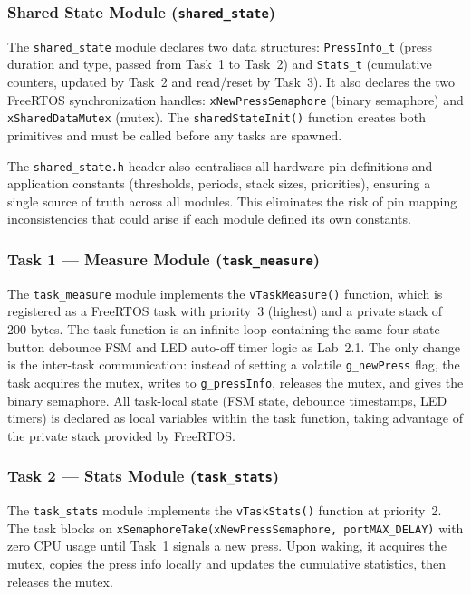 \subsubsection{Shared State Module (\texttt{shared\_state})}

The \texttt{shared\_state} module declares two data structures: \texttt{PressInfo\_t} (press duration and type, passed from Task~1 to Task~2) and \texttt{Stats\_t} (cumulative counters, updated by Task~2 and read/reset by Task~3). It also declares the two FreeRTOS synchronization handles: \texttt{xNewPressSemaphore} (binary semaphore) and \texttt{xSharedDataMutex} (mutex). The \texttt{sharedStateInit()} function creates both primitives and must be called before any tasks are spawned.

The \texttt{shared\_state.h} header also centralises all hardware pin definitions and application constants (thresholds, periods, stack sizes, priorities), ensuring a single source of truth across all modules. This eliminates the risk of pin mapping inconsistencies that could arise if each module defined its own constants.

\subsubsection{Task 1 --- Measure Module (\texttt{task\_measure})}

The \texttt{task\_measure} module implements the \texttt{vTaskMeasure()} function, which is registered as a FreeRTOS task with priority~3 (highest) and a private stack of 200 bytes. The task function is an infinite loop containing the same four-state button debounce FSM and LED auto-off timer logic as Lab~2.1. The only change is the inter-task communication: instead of setting a volatile \texttt{g\_newPress} flag, the task acquires the mutex, writes to \texttt{g\_pressInfo}, releases the mutex, and gives the binary semaphore. All task-local state (FSM state, debounce timestamps, LED timers) is declared as local variables within the task function, taking advantage of the private stack provided by FreeRTOS.

\subsubsection{Task 2 --- Stats Module (\texttt{task\_stats})}

The \texttt{task\_stats} module implements the \texttt{vTaskStats()} function at priority~2. The task blocks on \texttt{xSemaphoreTake(xNewPressSemaphore, portMAX\_DELAY)} with zero CPU usage until Task~1 signals a new press. Upon waking, it acquires the mutex, copies the press info locally and updates the cumulative statistics, then releases the mutex.

